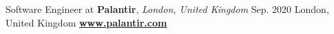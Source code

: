 \cveventflat
{Software Engineer at }
{\textbf{Palantir}, \textit{London, United Kingdom}}
{Sep. 2020}
{London, United Kingdom}
\newline
\href{https://www.palantir.com/}{\textbf{www.palantir.com}}
